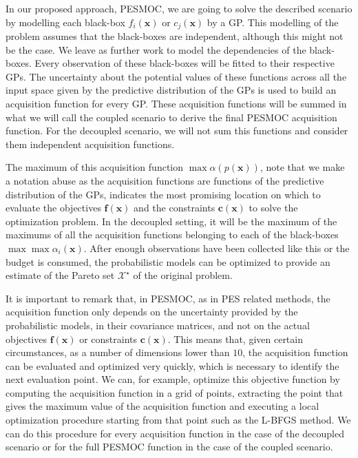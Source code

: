 In our proposed approach, PESMOC, we are going to solve the described scenario by modelling each black-box $f_i(\mathbf{x})$ or $c_j(\mathbf{x})$ by a GP. This modelling of the problem assumes that the black-boxes are independent, although this might not be the case. We leave as further work to model the dependencies of the black-boxes. Every observation of these black-boxes will be fitted to their respective GPs. The uncertainty about the potential values of these functions across all the input space given by the predictive distribution of the GPs is used to build an acquisition
function for every GP. These acquisition functions will be summed in what we will call the coupled scenario to derive the final PESMOC acquisition function. For the decoupled scenario, we will not sum this functions and consider them independent acquisition functions.

The maximum of this acquisition function $\max \alpha(p(\mathbf{x}))$, note that we make a notation abuse as the acquisition functions are functions of the predictive distribution of the GPs, indicates the most promising location on
which to evaluate the objectives $\mathbf{f}(\mathbf{x})$ and the constraints $\mathbf{c}(\mathbf{x})$ to solve the
optimization problem. In the decoupled setting, it will be the maximum of the maximums of all the acquisition functions belonging to each of the black-boxes $\max \max \alpha_i(\mathbf{x})$.
After enough observations have been collected like this or the budget is consumed, the probabilistic models can be optimized to provide an estimate of the Pareto set $\mathcal{X}^\star$ of the original problem. 

It is important to remark that, in PESMOC, as in PES related methods, the acquisition function only depends
on the uncertainty provided by the probabilistic models, in their covariance matrices, and not on the actual objectives $\mathbf{f}(\mathbf{x})$ or constraints $\mathbf{c}(\mathbf{x})$. This means that, given certain circumstances, as a number of dimensions lower than $10$, the acquisition function can be evaluated and optimized very quickly, which is necessary to identify the next evaluation point. We can, for example, optimize this objective function by computing the acquisition function in a grid of points, extracting the point that gives the maximum value of the acquisition function and executing a local optimization procedure starting from that point such as the L-BFGS method. We can do this procedure for every acquisition function in the case of the decoupled scenario or for the full PESMOC function in the case of the coupled scenario.

